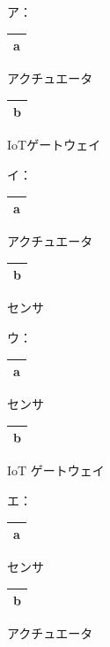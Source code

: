 \par\quad ア：
\noindent\begin{tabular}{|c|}
  \hline
  a \\
  \hline
\end{tabular}
アクチュエータ
\noindent\begin{tabular}{|c|}
  \hline
  b \\
  \hline
\end{tabular}
IoTゲートウェイ\par\quad
イ：
\noindent\begin{tabular}{|c|}
  \hline
  a \\
  \hline
\end{tabular}
アクチュエータ
\noindent\begin{tabular}{|c|}
  \hline
  b \\
  \hline
\end{tabular}
センサ\par\quad
ウ：
\noindent\begin{tabular}{|c|}
  \hline
  a \\
  \hline
\end{tabular}
センサ
\noindent\begin{tabular}{|c|}
  \hline
  b \\
  \hline
\end{tabular}
IoT ゲートウェイ\par\quad
エ：
\noindent\begin{tabular}{|c|}
  \hline
  a \\
  \hline
\end{tabular}
センサ
\noindent\begin{tabular}{|c|}
  \hline
  b \\
  \hline
\end{tabular}
アクチュエータ\\



